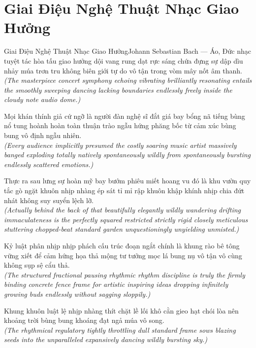 \section{Giai Điệu Nghệ Thuật Nhạc Giao Hưởng}
\begin{truyen}{Giai Điệu Nghệ Thuật Nhạc Giao Hưởng}{Johann Sebastian Bach --- Áo, Đức}
 nhạc tuyệt tác hòa tấu giao hưởng dội vang rung dạt rực sáng chứa đựng sự dập dìu nhảy múa trơn tru không biên giới tự do vô tận trong vòm mây nốt âm thanh.\\[4pt]
\textit{(The masterpiece concert symphony echoing vibrating brilliantly resonating entails the smoothly sweeping dancing lacking boundaries endlessly freely inside the cloudy note audio dome.)}

Mọi khán thính giả cứ ngỡ là người đàn nghệ sĩ đắt giá bay bổng nã tiếng bùng nổ tung hoành hoàn toàn thuận trào ngẫu hứng phăng bốc từ cảm xúc bùng bung vô định ngẫu nhiên.\\[4pt]
\textit{(Every audience implicitly presumed the costly soaring music artist massively banged exploding totally natively spontaneously wildly from spontaneously bursting endlessly scattered emotions.)}

Thực ra sau lưng sự hoàn mỹ bay bướm phiêu miết hoang vu đó là khu vườn quy tắc gò ngặt khuôn nhịp nhàng ép sát tỉ mỉ rập khuôn khập khính nhịp chia đứt nhát không suy suyển lệch lỡ.\\[4pt]
\textit{(Actually behind the back of that beautifully elegantly wildly wandering drifting immaculateness is the perfectly squared restricted strictly rigid closely meticulous stuttering chopped-beat standard garden unquestioningly unyielding unmisted.)}

Kỷ luật phân nhịp nhịp phách cấu trúc đoạn ngắt chính là khung rào bê tông vững xiết để cảm hứng họa thả mộng tư tưởng mọc lá bung nụ vô tận vô cùng không sụp sệ cẩu thả.\\[4pt]
\textit{(The structured fractional pausing rhythmic rhythm discipline is truly the firmly binding concrete fence frame for artistic inspiring ideas dropping infinitely growing buds endlessly without sagging sloppily.)}

\end{truyen}
\begin{baihoc}
  Khung khuôn luật lệ nhịp nhàng thít chặt lề lối khô cằn gieo hạt chói lòa nên khoảng trời bùng bung khoáng đạt ngả múa vô song.\\[4pt]
  \textit{(The rhythmical regulatory tightly throttling dull standard frame sows blazing seeds into the unparalleled expansively dancing wildly bursting sky.)}
\end{baihoc}

